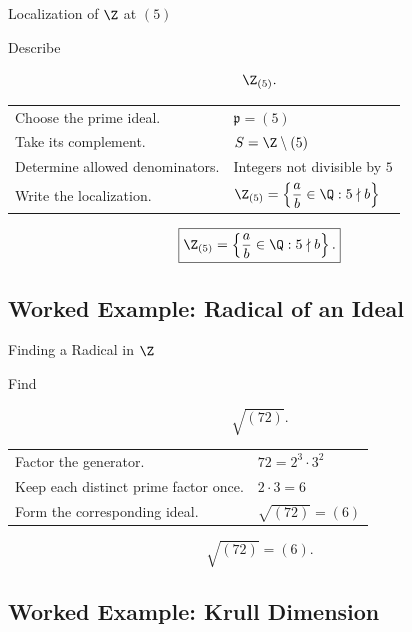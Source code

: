 \begin{workedexamplebox}{Localization of \(\Z\) at \((5)\)}

Describe

\[ \Z_{(5)}. \]

\begin{tabularx}{\textwidth}{@{}>{\raggedright\arraybackslash}p{}X@{}}
Choose the prime ideal. & \(\mathfrak p=(5)\)\\
Take its complement. & \(S=\Z\setminus(5)\)\\
Determine allowed denominators. & Integers not divisible by \(5\)\\
Write the localization. &
\(\displaystyle \Z_{(5)}
=\left\{\frac{a}{b}\in\Q:5\nmid b\right\}\)
\end{tabularx}

\begin{answerbox}
\[ \boxed{\displaystyle
\Z_{(5)}
=\left\{\frac{a}{b}\in\Q:5\nmid b\right\}.} \]
\end{answerbox}
\end{workedexamplebox}

\subsection{Worked Example: Radical of an Ideal}
\label{subsec:worked-radical}

\begin{workedexamplebox}{Finding a Radical in \(\Z\)}

Find

\[ \sqrt{(72)}. \]

\begin{tabularx}{\textwidth}{@{}>{\raggedright\arraybackslash}p{}X@{}}
Factor the generator. & \(72=2^3\cdot3^2\)\\
Keep each distinct prime factor once. & \(2\cdot3=6\)\\
Form the corresponding ideal. & \(\sqrt{(72)}=(6)\)
\end{tabularx}

\begin{answerbox}
\[ \boxed{\sqrt{(72)}=(6).} \]
\end{answerbox}
\end{workedexamplebox}

\subsection{Worked Example: Krull Dimension}
\label{subsec:worked-krull-dimension}

